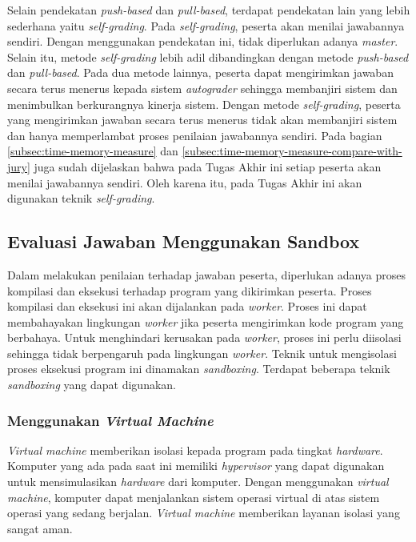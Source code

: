 \par Selain pendekatan \textit{push-based} dan \textit{pull-based}, terdapat pendekatan lain yang lebih sederhana yaitu \textit{self-grading}. Pada \textit{self-grading}, peserta akan menilai jawabannya sendiri. Dengan menggunakan pendekatan ini, tidak diperlukan adanya \textit{master}. Selain itu, metode \textit{self-grading} lebih adil dibandingkan dengan metode \textit{push-based} dan \textit{pull-based}. Pada dua metode lainnya, peserta dapat mengirimkan jawaban secara terus menerus kepada sistem \textit{autograder} sehingga membanjiri sistem dan menimbulkan berkurangnya kinerja sistem. Dengan metode \textit{self-grading}, peserta yang mengirimkan jawaban secara terus menerus tidak akan membanjiri sistem dan hanya memperlambat proses penilaian jawabannya sendiri. Pada bagian \ref{subsec:time-memory-measure} dan \ref{subsec:time-memory-measure-compare-with-jury} juga sudah dijelaskan bahwa pada Tugas Akhir ini setiap peserta akan menilai jawabannya sendiri. Oleh karena itu, pada Tugas Akhir ini akan digunakan teknik \textit{self-grading}. 

\subsection{Evaluasi Jawaban Menggunakan Sandbox}

\par Dalam melakukan penilaian terhadap jawaban peserta, diperlukan adanya proses kompilasi dan eksekusi terhadap program yang dikirimkan peserta. Proses kompilasi dan eksekusi ini akan dijalankan pada \textit{worker}. Proses ini dapat membahayakan lingkungan \textit{worker} jika peserta mengirimkan kode program yang berbahaya. Untuk menghindari kerusakan pada \textit{worker}, proses ini perlu diisolasi sehingga tidak berpengaruh pada lingkungan \textit{worker}. Teknik untuk mengisolasi proses eksekusi program ini dinamakan \textit{sandboxing}. Terdapat beberapa teknik \textit{sandboxing} yang dapat digunakan.

\subsubsection{Menggunakan \textit{Virtual Machine}}

\par \textit{Virtual machine} memberikan isolasi kepada program pada tingkat \textit{hardware}. Komputer yang ada pada saat ini memiliki \textit{hypervisor} yang dapat digunakan untuk mensimulasikan \textit{hardware} dari komputer. Dengan menggunakan \textit{virtual machine}, komputer dapat menjalankan sistem operasi virtual di atas sistem operasi yang sedang berjalan. \textit{Virtual machine} memberikan layanan isolasi yang sangat aman.

